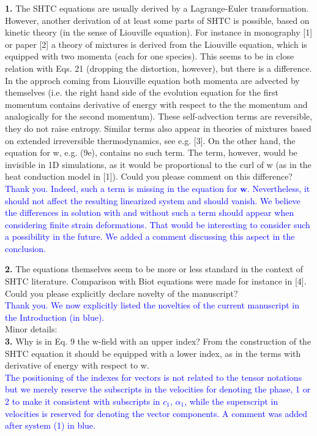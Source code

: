 \documentclass[3p,times,table]{article}
\newcommand{\ww}{{\bm{w}}}
\newcommand{\revThree}[1]{\textcolor{Blue}{#1}}
\begin{document}
\textbf{1.} The SHTC equations are usually derived by a 
Lagrange-Euler transformation. However, 
another 
derivation of at least some parts of SHTC is possible, based on kinetic theory (in the sense of 
Liouville equation). For instance in monography [1] or paper [2] a theory of mixtures is derived 
from the Liouville equation, which is equipped with two momenta (each for one species). This seems 
to be in close relation with Eqs. 21 (dropping the distortion, however), but there is a difference. 
In the approch coming from Liouville equation both momenta are advected by themselves (i.e. the 
right hand side of the evolution equation for the first momentum contains derivative of energy with 
respect to the the momentum and analogically for the second momentum). These self-advection terms 
are reversible, they do not raise entropy. Similar terms also appear in theories of mixtures based 
on extended irreversible thermodynamics, see e.g. [3]. On the other hand, the equation for w, e.g. 
(9e),
contains no such term. The term, however, would be invisible in 1D simulations, as it would be 
proportional to the curl of w (as in the heat conduction model in [1]). Could you please comment on 
this difference?
\\
\revThree{Thank you. Indeed, such a term is missing in the equation 
for $ \ww $. Nevertheless, it should not affect the resulting 
linearized system and should vanish. We believe the differences in 
solution with and without such a term should appear when considering 
finite strain deformations. That would be interesting to consider 
such a possibility in the future. We added a comment discussing this 
aspect in the conclusion.}

\textbf{2.} The equations themselves seem to be more or less standard in the context of SHTC 
literature. 
Comparison with Biot equations were made for instance in [4]. Could you please explicitly declare 
novelty of the manuscript?
\\
\revThree
{Thank you. We now explicitly listed the novelties of the 
current 
manuscript in the Introduction (in blue).}
\\

Minor details:\\

\textbf{3.} Why is in Eq. 9 the w-field with an upper index? From 
the construction of the SHTC 
equation it 
should be equipped with a lower index, as in the terms with 
derivative of energy with respect to w.
\\
\revThree{The positioning of the indexes for vectors is not related 
to the tensor notations but we merely reserve the subscripts in the 
velocities for denoting the phase, 1 or 2 to make it consistent with 
subscripts in $ c_1 $, $ \alpha_1 $, while the superscript in 
velocities is 
reserved for denoting the vector components. A comment was added 
after system (1) in blue.}
\\
\end{document}
